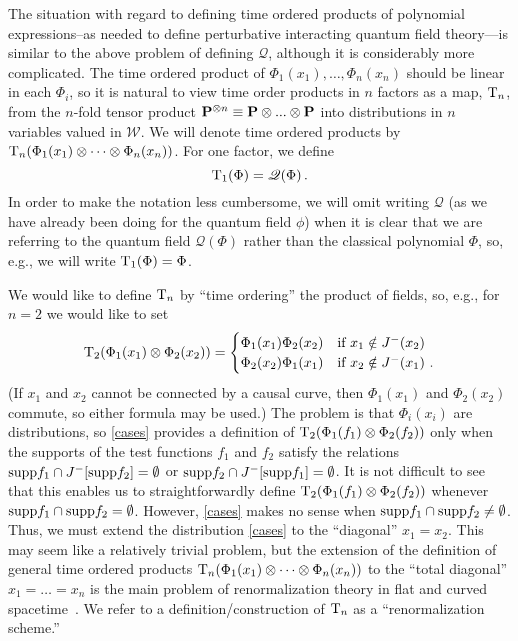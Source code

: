 \documentclass[12pt]{article}
\newcommand{\eQ}{\mathscr{Q}}
\newcommand{\eW}{\mathscr{W}}
\renewcommand{\O}{\Phi}
\newcommand{\T}{{\rm T}}
\renewcommand{\P}{{\bf P}}
\theoremstyle{plain}
\theoremstyle{definition}
\def\ben{\begin{equation}}
\def\een{\end{equation}}
\begin{document}
The situation with regard to defining time ordered products of polynomial expressions--as needed to define perturbative interacting quantum field theory---is similar to the above problem of defining $\eQ$,
although it is considerably more complicated. The time ordered product of $\O_1(x_1), \dots, \O_n(x_n)$ should be
linear in each $\O_i$, so it is natural to view time order products in $n$ factors as a map, $\T_n$, from the $n$-fold tensor product
$\P^{\otimes n} \equiv \P \otimes ... \otimes \P$ into distributions in $n$ variables valued in $\eW$.
We will denote time ordered products by $\T_n(\O_1(x_1) \otimes \dots \otimes \O_n(x_n))$.
For one factor, we define
\ben
\T_1 (\O) = \eQ(\O) \, .
\een
In order to make the notation less cumbersome, we will
omit writing $\eQ$ (as we have already been doing for the quantum field $\phi$) when it is clear that we are referring to the quantum field $\eQ(\O)$ rather than the classical polynomial $\O$, so, e.g., we will write $\T_1(\O) = \O$.

We would like to define $\T_n$ by ``time ordering'' the product of fields, so, e.g., for
$n=2$ we would like to set
\ben\label{cases}
\T_2(\Phi_1(x_1) \otimes \Phi_2(x_2)) =
\begin{cases}
\Phi_1(x_1) \Phi_2(x_2) & \text{if $x_1 \notin J^-(x_2)$}\\
\Phi_2(x_2) \Phi_1(x_1) & \text{if $x_2 \notin J^-(x_1)$}~.
\end{cases}
\een
(If $x_1$ and $x_2$ cannot be connected by a causal curve, then $\Phi_1(x_1)$ and $\Phi_2(x_2)$ commute, so
either formula may be used.) The problem is that $\Phi_i(x_i)$ are distributions, so \eqref{cases} provides
a definition of $\T_2(\Phi_1(f_1) \otimes \Phi_2(f_2))$ only when the supports of the test functions $f_1$ and $f_2$ satisfy
the relations ${\rm supp} f_1 \cap J^-[{\rm supp} f_2] = \emptyset$ or ${\rm supp} f_2 \cap J^-[{\rm supp} f_1] = \emptyset$. It is not difficult to see that this enables us to straightforwardly define $\T_2(\Phi_1(f_1) \otimes \Phi_2(f_2))$ whenever ${\rm supp} f_1 \cap {\rm supp} f_2 = \emptyset$.
However, \eqref{cases} makes no sense when ${\rm supp} f_1 \cap {\rm supp} f_2 \neq \emptyset$. Thus, we
must extend the distribution \eqref{cases} to the ``diagonal'' $x_1=x_2$. This may seem like a relatively
trivial problem, but the extension of the definition of general time ordered products $\T_n(\Phi_1(x_1) \otimes \dots \otimes \Phi_n(x_n))$
to the ``total diagonal'' $x_1=\dots=x_n$ is the main problem of renormalization theory
in flat and curved spacetime~\cite{eg,bs}. We refer to a definition/construction of $\T_n$ as a ``renormalization scheme.''
\end{document}
